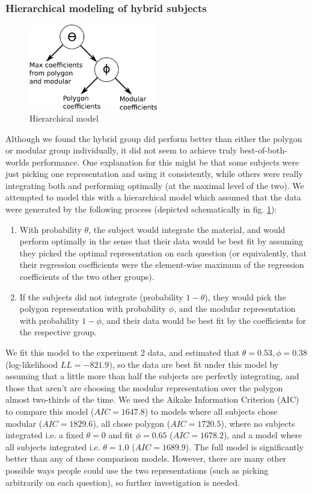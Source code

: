 \documentclass[man,10pt]{apa6}
\begin{document}
\subsubsection{Hierarchical modeling of hybrid subjects}
\begin{figure}
\centering
\includegraphics[width=0.5\textwidth]{figures/hierarchical_model_schematic.png}
\caption{Hierarchical model}
\label{hierarchicalmodel}

\end{figure}
Although we found the hybrid group did perform better than either the polygon or modular group individually, it did not seem to achieve truly best-of-both-worlds performance. One explanation for this might be that some subjects were just picking one representation and using it consistently, while others were really integrating both and performing optimally (at the maximal level of the two). We attempted to model this with a hierarchical model which assumed that the data were generated by the following process (depicted schematically in fig. \ref{hierarchicalmodel}): 
\begin{enumerate}
\item With probability $\theta$, the subject would integrate the material, and would perform optimally in the sense that their data would be best fit by assuming they picked the optimal representation on each question (or equivalently, that their regression coefficients were the element-wise maximum of the regression coefficients of the two other groups). 
\item If the subjects did not integrate (probability $1-\theta$), they would pick the polygon representation with probability $\phi$, and the modular representation with probability $1-\phi$, and their data would be best fit by the coefficients for the respective group.
\end{enumerate}
We fit this model to the experiment 2 data, and estimated that $\theta = 0.53, \phi = 0.38$ (log-likelihood $LL=-821.9$), so the data are best fit under this model by assuming that a little more than half the subjects are perfectly integrating, and those that aren't are choosing the modular representation over the polygon almost two-thirds of the time. We used the Aikake Information Criterion (AIC) to compare this model ($AIC = 1647.8$) to models where all subjects chose modular ($AIC=1829.6$), all chose polygon ($AIC = 1720.5$), where no subjects integrated i.e. a fixed $\theta = 0$ and fit $\phi = 0.65$ ($AIC = 1678.2$), and a model where all subjects integrated i.e. $\theta = 1.0$ ($AIC = 1689.9$). The full model is significantly better than any of these comparison models. However, there are many other possible ways people could use the two representations (such as picking arbitrarily on each question), so further investigation is needed.\par
\end{document}
